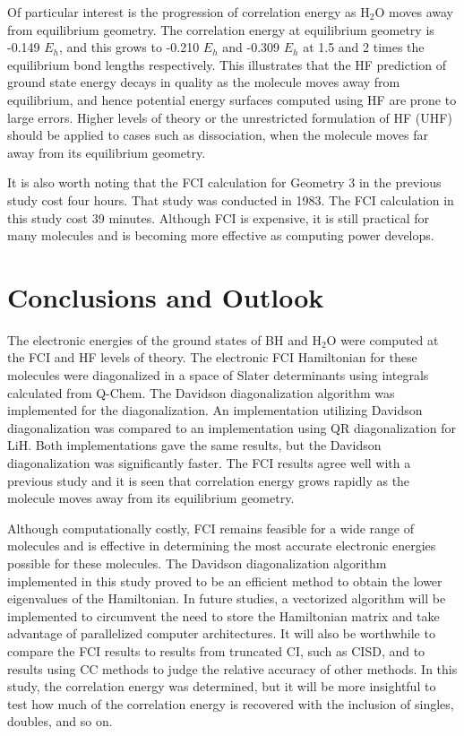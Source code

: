 \documentclass[final,3p,times,twocolumn]{elsarticle}
\begin{document}
Of particular interest is the progression of correlation energy as H$_2$O moves away from equilibrium geometry. The correlation energy at equilibrium geometry is -0.149 $E_h$, and this grows to -0.210 $E_h$ and -0.309 $E_h$ at 1.5 and 2 times the equilibrium bond lengths respectively. This illustrates that the HF prediction of ground state energy decays in quality as the molecule moves away from equilibrium, and hence potential energy surfaces computed using HF are prone to large errors. Higher levels of theory or the unrestricted formulation of HF (UHF) should be applied to cases such as dissociation, when the molecule moves far away from its equilibrium geometry.

It is also worth noting that the FCI calculation for Geometry 3 in the previous study cost four hours.\cite{handy-1983} That study was conducted in 1983. The FCI calculation in this study cost 39 minutes. Although FCI is expensive, it is still practical for many molecules and is becoming more effective as computing power develops.


\section{Conclusions and Outlook}
\label{sect:Concl}
The electronic energies of the ground states of BH and H$_2$O were computed at the FCI and HF levels of theory. The electronic FCI Hamiltonian for these molecules were diagonalized in a space of Slater determinants using integrals calculated from Q-Chem. The Davidson diagonalization algorithm was implemented for the diagonalization. An implementation utilizing Davidson diagonalization was compared to an implementation using QR diagonalization for LiH. Both implementations gave the same results, but the Davidson diagonalization was significantly faster. The FCI results agree well with a previous study\cite{handy-1983} and it is seen that correlation energy grows rapidly as the molecule moves away from its equilibrium geometry.

Although computationally costly, FCI remains feasible for a wide range of molecules and is effective in determining the most accurate electronic energies possible for these molecules. The Davidson diagonalization algorithm implemented in this study proved to be an efficient method to obtain the lower eigenvalues of the Hamiltonian. In future studies, a vectorized algorithm will be implemented to circumvent the need to store the Hamiltonian matrix and take advantage of parallelized computer architectures.\cite{handy-1983} It will also be worthwhile to compare the FCI results to results from truncated CI, such as CISD, and to results using CC methods to judge the relative accuracy of other methods. In this study, the correlation energy was determined, but it will be more insightful to test how much of the correlation energy is recovered with the inclusion of singles, doubles, and so on.
\end{document}
